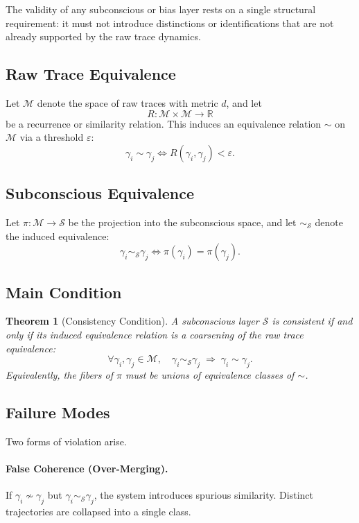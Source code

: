 \documentclass[12pt,a4paper]{article}
\newtheorem{theorem}{Theorem}[section]
\begin{document}
The validity of any subconscious or bias layer rests on a single structural requirement: it must not introduce distinctions or identifications that are not already supported by the raw trace dynamics.

\subsection{Raw Trace Equivalence}

Let $\mathcal{M}$ denote the space of raw traces with metric $d$, and let
\[
R : \mathcal{M} \times \mathcal{M} \rightarrow \mathbb{R}
\]
be a recurrence or similarity relation. This induces an equivalence relation $\sim$ on $\mathcal{M}$ via a threshold $\varepsilon$:
\[
\gamma_i \sim \gamma_j \iff R(\gamma_i, \gamma_j) < \varepsilon.
\]

\subsection{Subconscious Equivalence}

Let $\pi : \mathcal{M} \rightarrow \mathcal{S}$ be the projection into the subconscious space, and let $\sim_{\mathcal{S}}$ denote the induced equivalence:
\[
\gamma_i \sim_{\mathcal{S}} \gamma_j \iff \pi(\gamma_i) = \pi(\gamma_j).
\]

\subsection{Main Condition}

\begin{theorem}[Consistency Condition]
\label{thm:consistency}
A subconscious layer $\mathcal{S}$ is consistent if and only if its induced equivalence relation is a coarsening of the raw trace equivalence:
\[
\forall \gamma_i, \gamma_j \in \mathcal{M}, \quad
\gamma_i \sim_{\mathcal{S}} \gamma_j \;\Rightarrow\; \gamma_i \sim \gamma_j.
\]
Equivalently, the fibers of $\pi$ must be unions of equivalence classes of $\sim$.
\end{theorem}

\subsection{Failure Modes}

Two forms of violation arise.

\paragraph{False Coherence (Over-Merging).}
If $\gamma_i \not\sim \gamma_j$ but $\gamma_i \sim_{\mathcal{S}} \gamma_j$, the system introduces spurious similarity. Distinct trajectories are collapsed into a single class.
\end{document}
